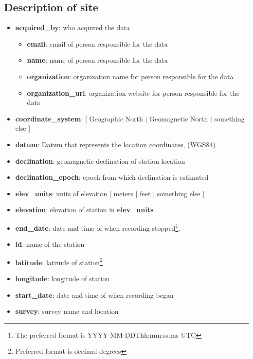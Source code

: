 \documentclass{article}
\newcommand{\attr}[1]{\textbf{#1}}
\begin{document}
\subsection{Description of \textbf{site}}

\begin{itemize}
	\setlength{\itemsep}{.05em}
	\item \attr{acquired\_by}: who acquired the data
	\begin{itemize}
		\setlength{\itemsep}{.05em}
		\item \attr{email}: email of person responsible for the data
		\item \attr{name}: name of person responsible for the data
		\item \attr{organization}: organization name for person responsible for the data
		\item \attr{organization\_url}: organization website for person responsible for the data
	\end{itemize}
	\item \attr{coordinate\_system}: [ Geographic North $|$ Geomagnetic North $|$ something else ]
	\item \attr{datum}: Datum that represents the location coordinates, (WGS84)
	\item \attr{declination}: geomagnetic declination of station location
	\item \attr{declination\_epoch}: epoch from which declination is estimated
	\item \attr{elev\_units}: units of elevation [ meters $|$ feet $|$ something else ]
	\item \attr{elevation}: elevation of station in \attr{elev\_units}
	\item \attr{end\_date}: date and time of when recording stopped\footnote[1]{The preferred format is YYYY-MM-DDThh:mm:ss.ms UTC}.
	\item \attr{id}: name of the station
	\item \attr{latitude}: latitude of station\footnote[2]{Preferred format is decimal degrees}
	\item \attr{longitude}: longitude of station\footnotemark[2]
	\item \attr{start\_date}: date and time of when recording began\footnotemark[1]
	\item \attr{survey}: survey name and location  
\end{itemize}

\newpage
\end{document}
